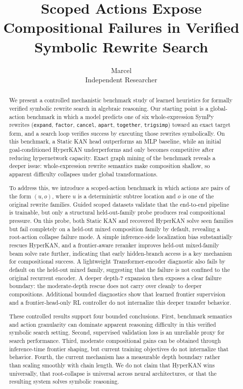 \documentclass[11pt]{article}
\title{\textbf{Scoped Actions Expose Compositional Failures in Verified Symbolic Rewrite Search}}
\author{Marcel\\Independent Researcher}
\date{}
\newcommand{\sympy}{SymPy}
\newcommand{\hyperkan}{HyperKAN}
\newcommand{\staticKAN}{Static KAN}
\newcommand{\mlp}{MLP}
\begin{document}
\maketitle

\begin{abstract}
We present a controlled mechanistic benchmark study of learned heuristics for formally verified symbolic rewrite search in algebraic reasoning. Our starting point is a global-action benchmark in which a model predicts one of six whole-expression \sympy{} rewrites (\texttt{expand}, \texttt{factor}, \texttt{cancel}, \texttt{apart}, \texttt{together}, \texttt{trigsimp}) toward an exact target form, and a search loop verifies success by executing those rewrites symbolically. On this benchmark, a \staticKAN{} head outperforms an \mlp{} baseline, while an initial goal-conditioned \hyperkan{} underperforms and only becomes competitive after reducing hypernetwork capacity. Exact graph mining of the benchmark reveals a deeper issue: whole-expression rewrite semantics make composition shallow, so apparent difficulty collapses under global transformations.

To address this, we introduce a scoped-action benchmark in which actions are pairs of the form $(u,o)$, where $u$ is a deterministic subtree location and $o$ is one of the original rewrite families. Guided scoped datasets validate that the end-to-end pipeline is trainable, but only a structural held-out-family probe produces real compositional pressure. On this probe, both \staticKAN{} and recovered \hyperkan{} solve seen families but fail completely on a held-out mixed composition family by default, revealing a root-action collapse failure mode. A simple inference-side localization bias substantially rescues \hyperkan{}, and a frontier-aware reranker improves held-out mixed-family beam solve rate further, indicating that early hidden-branch access is a key mechanism for compositional success. A lightweight Transformer-encoder diagnostic also fails by default on the held-out mixed family, suggesting that the failure is not confined to the original recurrent encoder. A deeper depth-7 expansion then exposes a clear failure boundary: the moderate-depth rescue does not carry over cleanly to deeper compositions. Additional bounded diagnostics show that learned frontier supervision and a frontier-head-only RL controller do not internalize this deeper transfer behavior.

These controlled results support four bounded conclusions. First, benchmark semantics and action granularity can dominate apparent reasoning difficulty in this verified symbolic search setting. Second, supervised validation loss is an unreliable proxy for search performance. Third, moderate compositional gains can be obtained through inference-time frontier shaping, but current training objectives do not internalize that behavior. Fourth, the current mechanism has a measurable depth boundary rather than scaling smoothly with chain length. We do not claim that \hyperkan{} wins universally, that root-collapse is universal across neural architectures, or that the resulting system solves symbolic reasoning.
\end{abstract}
\end{document}
